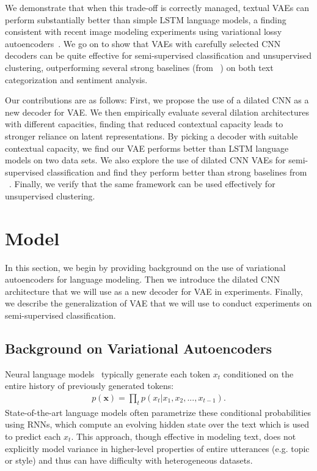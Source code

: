 \documentclass{article}
\begin{document}
We demonstrate that when this trade-off is correctly managed, textual VAEs can perform substantially better than simple LSTM language models, a finding consistent with recent image modeling experiments
using variational lossy autoencoders~\cite{chen2016variational}.
We go on to show that VAEs with carefully selected CNN decoders can be quite effective for semi-supervised classification and unsupervised clustering,
outperforming several strong baselines (from ~\cite{dai2015semi}) on both text categorization and sentiment analysis.

Our contributions are as follows: First, we propose the use of a dilated CNN as a new decoder
for VAE. We then empirically evaluate several dilation architectures with different capacities, finding that
reduced contextual capacity leads to stronger reliance on latent representations.
By picking a decoder with suitable contextual capacity, we find our VAE performs better than
LSTM language models on two data sets.
We also explore the use of dilated CNN VAEs for semi-supervised
classification and find they perform better than strong baselines from
~\cite{dai2015semi}. Finally, we verify that the same framework can be used
effectively for unsupervised clustering.


\section{Model}
In this section, we begin by providing background on the use of variational autoencoders for language modeling.
Then we introduce the dilated CNN architecture that we will use as a new decoder for VAE in experiments.
Finally, we describe the generalization of VAE that we will use to conduct experiments on semi-supervised classification.


\subsection{Background on Variational Autoencoders}
Neural language models~\cite{mikolov2010recurrent} typically generate each token
$x_{t}$ conditioned on the entire history of previously generated tokens:
\begin{align}
  p(\mathbf{x}) = \prod_{t}p(x_{t} | x_{1}, x_{2}, ..., x_{t-1}).
  \label{eq:lm}
\end{align}
State-of-the-art language models often parametrize these conditional probabilities
using RNNs, which compute an evolving hidden state
over the text which is used to predict each $x_{t}$. This approach, though effective in modeling text, does not explicitly model variance in higher-level properties of entire utterances (e.g. topic or style) and thus can have difficulty with heterogeneous datasets.
\end{document}
